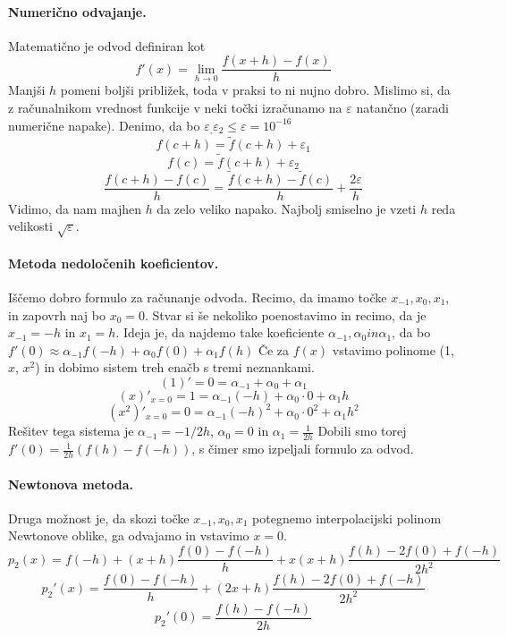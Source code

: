 \documentclass[a4paper]{article}
\begin{document}
\paragraph{Numerično odvajanje.} Matematično je odvod definiran kot $$f'(x) = \lim_{h \to 0}\frac{f(x+h) - f(x)}{h}$$
Manjši $h$ pomeni boljši približek, toda v praksi to ni nujno dobro. Mislimo si, da z računalnikom vrednost funkcije v neki točki izračunamo na $\varepsilon$ natančno (zaradi numerične napake).
Denimo, da bo $\varepsilon_, \varepsilon_2 \leq \varepsilon = 10^{-16}$
$$f(c+h) = \tilde{f}(c+h) + \varepsilon_1$$
$$f(c) = \tilde{f}(c+h) + \varepsilon_2$$
$$\frac{f(c+h) - f(c)}{h} = \frac{\tilde{f}(c+h) - \tilde{f}(c)}{h} + \frac{2\varepsilon}{h}$$
Vidimo, da nam majhen $h$ da zelo veliko napako. Najbolj smiselno je vzeti $h$ reda velikosti $\sqrt{\varepsilon}$.
\paragraph{Metoda nedoločenih koeficientov.} Iščemo dobro formulo za računanje odvoda. Recimo, da imamo točke $x_{-1}, x_0, x_1$, in zapovrh naj bo $x_0 = 0$.
Stvar si še nekoliko poenostavimo in recimo, da je $x_{-1} = -h$ in $x_1 = h$.
Ideja je, da najdemo take koeficiente $\alpha_{-1}, \alpha_0 in \alpha_1$, da bo $f'(0) \approx \alpha_{-1} f(-h) + \alpha_0 f(0) + \alpha_1 f(h)$
Če za $f(x)$ vstavimo polinome (1, $x$, $x^2$) in dobimo sistem treh enačb s tremi neznankami.
$$(1)' = 0 = \alpha_{-1} + \alpha_0 + \alpha_{1}$$
$$(x)'_{x=0} = 1 = \alpha_{-1}(-h) + \alpha_{0} \cdot 0 + \alpha_1 h$$
$$(x^2)'_{x=0} = 0 = \alpha_{-1}(-h)^2 + \alpha_{0}\cdot 0^2 + \alpha_{1} h^2$$ 
Rešitev tega sistema je $\alpha_{-1} = -1/2h$, $\alpha_0 = 0$ in $\alpha_{1} = \frac{1}{2h}$
Dobili smo torej $\displaystyle{f'(0) = \frac{1}{2h}\left(f(h) - f(-h)\right)}$, s čimer smo izpeljali formulo za odvod.
\paragraph{Newtonova metoda.} Druga možnost je, da skozi točke $x_{-1}, x_{0}, x_{1}$ potegnemo interpolacijski polinom Newtonove oblike, ga odvajamo in vstavimo $x=0$.
$$p_2(x) = f(-h) + (x+h)\frac{f(0) - f(-h)}{h} + x(x+h)\frac{f(h) - 2f(0) + f(-h)}{2h^2}$$
$$p_2'(x) = \frac{f(0) - f(-h)}{h} + (2x+h)\frac{f(h) - 2f(0) + f(-h)}{2h^2}$$
$$p_2'(0) = \frac{f(h) - f(-h)}{2h}$$
\end{document}
